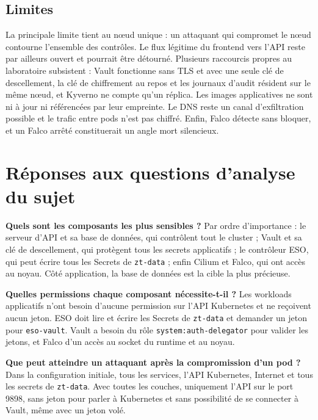 \documentclass[11pt,a4paper]{article}
\newcommand{\code}[1]{\texttt{#1}}
\begin{document}
\subsection{Limites}
\label{sec:limites}

La principale limite tient au nœud unique : un attaquant qui compromet le nœud contourne l'ensemble des contrôles. Le flux légitime du frontend vers l'API reste par ailleurs ouvert et pourrait être détourné. Plusieurs raccourcis propres au laboratoire subsistent : Vault fonctionne sans TLS et avec une seule clé de descellement, la clé de chiffrement au repos et les journaux d'audit résident sur le même nœud, et Kyverno ne compte qu'un réplica. Les images applicatives ne sont ni à jour ni référencées par leur empreinte. Le DNS reste un canal d'exfiltration possible et le trafic entre pods n'est pas chiffré. Enfin, Falco détecte sans bloquer, et un Falco arrêté constituerait un angle mort silencieux.

\section{Réponses aux questions d'analyse du sujet}

\textbf{Quels sont les composants les plus sensibles ?} Par ordre d'importance : le serveur d'API et sa base de données, qui contrôlent tout le cluster ; Vault et sa clé de descellement, qui protègent tous les secrets applicatifs ; le contrôleur ESO, qui peut écrire tous les Secrets de \code{zt-data} ; enfin Cilium et Falco, qui ont accès au noyau. Côté application, la base de données est la cible la plus précieuse.

\textbf{Quelles permissions chaque composant nécessite-t-il ?} Les workloads applicatifs n'ont besoin d'aucune permission sur l'API Kubernetes et ne reçoivent aucun jeton. ESO doit lire et écrire les Secrets de \code{zt-data} et demander un jeton pour \code{eso-vault}. Vault a besoin du rôle \code{system:auth-delegator} pour valider les jetons, et Falco d'un accès au socket du runtime et au noyau.

\textbf{Que peut atteindre un attaquant après la compromission d'un pod ?} Dans la configuration initiale, tous les services, l'API Kubernetes, Internet et tous les secrets de \code{zt-data}. Avec toutes les couches, uniquement l'API sur le port 9898, sans jeton pour parler à Kubernetes et sans possibilité de se connecter à Vault, même avec un jeton volé.
\end{document}
